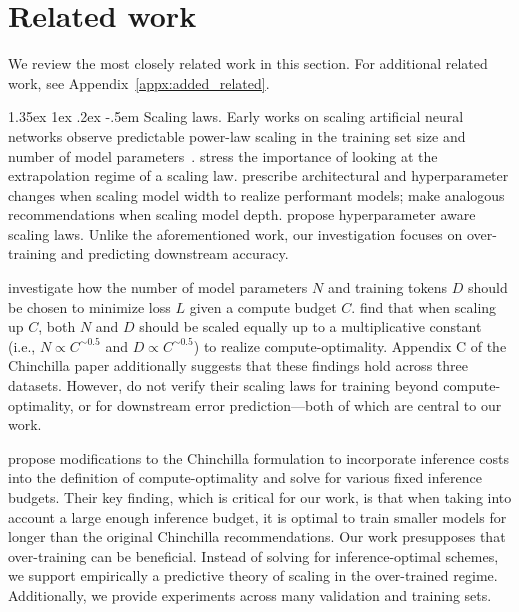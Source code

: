 \documentclass[dvipsnames,11pt]{article}
\makeatletter
\renewcommand\paragraph{\@startsection{paragraph}{4}{\z@}                                     {1.35ex \@plus1ex \@minus.2ex}                                {-.5em}
{\normalfont\normalsize\bfseries}}
\makeatother
\begin{document}
\section{Related work}
\label{sec:related}
We review the most closely related work in this section.
For additional related work, see Appendix~\ref{appx:added_related}.

\paragraph{Scaling laws.}
Early works on scaling artificial neural networks observe predictable power-law scaling in the training set size and number of model parameters~\cite{og_scaling,hestness2019beyond,rosenfeld_ConstructivePredictionGeneralization_2020}. 
\citet{alabdulmohsin2022revisiting} stress the importance of looking at the extrapolation regime of a scaling law.
\citet{yang2022tensor} prescribe architectural and hyperparameter changes when scaling model width to realize performant models; \citet{yang2023tensor} make analogous recommendations when scaling model depth.
\citet{Bi2024DeepSeekLS} propose hyperparameter aware scaling laws.
Unlike the aforementioned work, our investigation focuses on over-training and predicting downstream accuracy.

\citet{chinchilla} investigate how the number of model parameters $N$ and training tokens $D$ should be chosen to minimize loss $L$ given a compute budget $C$.
\citet{chinchilla} find that when scaling up $C$, both $N$ and $D$ should be scaled equally up to a multiplicative constant (i.e., $N \propto C^{\sim 0.5}$ and $D \propto C^{\sim 0.5}$) to realize compute-optimality.
Appendix C of the Chinchilla paper additionally suggests that these findings hold across three datasets.
However, \citet{chinchilla} do not verify their scaling laws for training beyond compute-optimality, or for downstream error prediction---both of which are central to our work. 

\citet{Sardana2023Beyond} propose modifications to the Chinchilla formulation to incorporate inference costs into the definition of compute-optimality and solve for various fixed inference budgets.
Their key finding, which is critical for our work, is that when taking into account a large enough inference budget, it is optimal to train smaller models for longer than the original Chinchilla recommendations.
Our work presupposes that over-training can be beneficial.
Instead of solving for inference-optimal schemes, we support empirically a predictive theory of scaling in the over-trained regime.
Additionally, we provide experiments across many validation and training sets.
\end{document}
